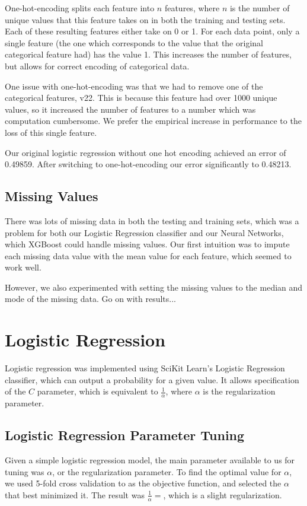 \documentclass[twoside,11pt]{article}
\theoremstyle{definition}
\begin{document}
    One-hot-encoding splits each feature into $n$ features, where $n$ is the number of unique values that this feature takes on in both the training and testing sets. Each of these resulting features either take on 0 or 1. For each data point, only a single feature (the one which corresponds to the value that the original categorical feature had) has the value 1. This increases the number of features, but allows for correct encoding of categorical data.

    One issue with one-hot-encoding was that we had to remove one of the categorical features, v22. This is because this feature had over 1000 unique values, so it increased the number of features to a number which was computation cumbersome. We prefer the empirical increase in performance to the loss of this single feature.

    Our original logistic regression without one hot encoding achieved an error of 0.49859. After switching to one-hot-encoding our error significantly to 0.48213.
    
  \subsection{Missing Values}
    There was lots of missing data in both the testing and training sets, which was a problem for both our Logistic Regression classifier and our Neural Networks, which XGBoost could handle missing values. Our first intuition was to impute each missing data value with the mean value for each feature, which seemed to work well. 

    However, we also experimented with setting the missing values to the median and mode of the missing data. Go on with results...

\section{Logistic Regression}
  Logistic regression was implemented using SciKit Learn's Logistic Regression classifier, which can output a probability for a given value. It allows specification of the $C$ parameter, which is equivalent to $\frac{1}{\alpha}$, where $\alpha$ is the regularization parameter.

  \subsection{Logistic Regression Parameter Tuning}
  Given a simple logistic regression model, the main parameter available to us for tuning was $\alpha$, or the regularization parameter. To find the optimal value for $\alpha$, we used 5-fold cross validation to as the objective function, and selected the $\alpha$ that best minimized it. The result was $\frac{1}{\alpha} = $, which is a slight regularization.
\end{document}
